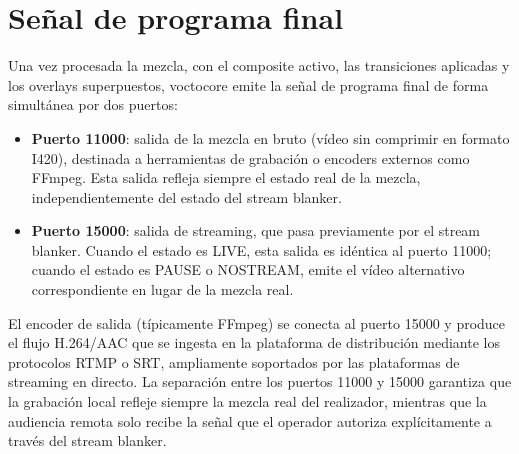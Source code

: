 \section{Señal de programa final}
\label{sec:senal_programa}

Una vez procesada la mezcla, con el composite activo, las transiciones aplicadas y
los overlays superpuestos, voctocore emite la señal de programa final de forma
simultánea por dos puertos:

\begin{itemize}
  \item \textbf{Puerto 11000}: salida de la mezcla en bruto (vídeo sin comprimir en
        formato I420), destinada a herramientas de grabación o encoders externos como
        FFmpeg. Esta salida refleja siempre el estado real de la mezcla,
        independientemente del estado del stream blanker.
  \item \textbf{Puerto 15000}: salida de streaming, que pasa previamente por el
        stream blanker. Cuando el estado es LIVE, esta salida es idéntica al puerto
        11000; cuando el estado es PAUSE o NOSTREAM, emite el vídeo alternativo
        correspondiente en lugar de la mezcla real.
\end{itemize}

El encoder de salida (típicamente FFmpeg) se conecta al puerto 15000 y produce el
flujo H.264/AAC que se ingesta en la plataforma de distribución mediante los protocolos
RTMP o SRT, ampliamente soportados por las plataformas de streaming en directo. La separación entre los puertos 11000 y
15000 garantiza que la grabación local refleje siempre la mezcla real del realizador,
mientras que la audiencia remota solo recibe la señal que el operador autoriza
explícitamente a través del stream blanker.
